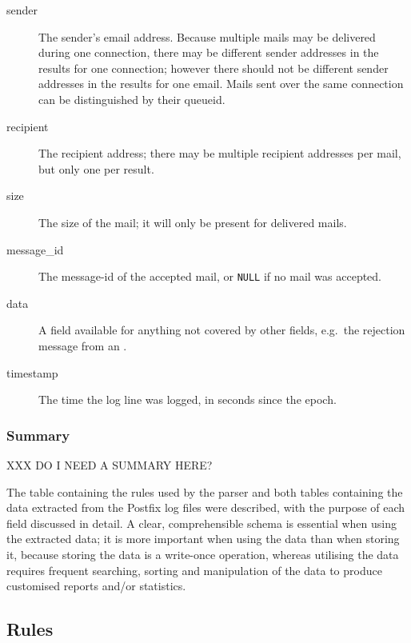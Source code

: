 \begin{description}
    \item [sender] The sender's email address.  Because multiple mails may
        be delivered during one connection, there may be different sender
        addresses in the results for one connection; however there should
        not be different sender addresses in the results for one email.
        Mails sent over the same connection can be distinguished by their
        queueid.

    \item [recipient] The recipient address; there may be multiple
        recipient addresses per mail, but only one per result.

    \item [size] The size of the mail; it will only be present for
        delivered mails.

    \item [message\_id] The message-id of the accepted mail, or
        \texttt{NULL} if no mail was accepted.

    \item [data] A field available for anything not covered by other
        fields, e.g.\ the rejection message from an \DNSBL{}\@.

    \item [timestamp] The time the log line was logged, in seconds since
        the epoch.

\end{description}

\subsubsection{Summary}

XXX DO I NEED A SUMMARY HERE\@?

The table containing the rules used by the parser and both tables
containing the data extracted from the Postfix log files were described,
with the purpose of each field discussed in detail.  A clear,
comprehensible schema is essential when using the extracted data; it is
more important when using the data than when storing it, because storing
the data is a write-once operation, whereas utilising the data requires
frequent searching, sorting and manipulation of the data to produce
customised reports and/or statistics.


\subsection{Rules}

